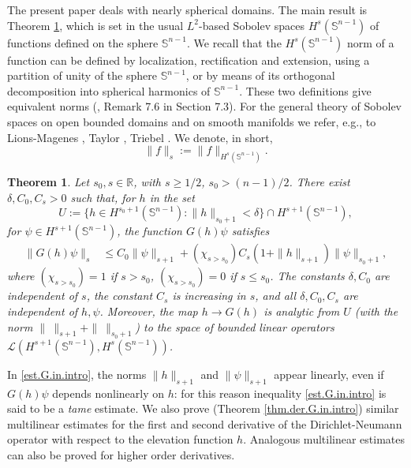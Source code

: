 \documentclass[10pt,reqno,a4paper]{article}
\numberwithin{equation}{section}
\theoremstyle{plain}
\newtheorem{theorem}{Theorem}[section]
\theoremstyle{definition}
\newcommand{\R}{{\mathbb R}}
\renewcommand{\S}{{\mathbb S}}
\newcommand{\mL}{\mathcal{L}}
\begin{document}
The present paper deals with nearly spherical domains. 
The main result is Theorem \ref{thm.G.in.intro}, which is 
set in the usual $L^2$-based Sobolev spaces $H^s(\S^{n-1})$ 
of functions defined on the sphere $\S^{n-1}$. 
We recall that the $H^s(\S^{n-1})$ norm of a function 
can be defined by localization, rectification and extension, 
using a partition of unity of the sphere $\S^{n-1}$,  
or by means of its orthogonal decomposition into spherical harmonics of $\S^{n-1}$. 
These two definitions give equivalent norms 
(\cite{Lions.Magenes.volume.1}, Remark 7.6 in Section 7.3). 
For the general theory of Sobolev spaces on open bounded domains and on smooth manifolds 
we refer, e.g., to Lions-Magenes \cite{Lions.Magenes.volume.1}, 
Taylor \cite{Taylor.volume.1}, Triebel \cite{Triebel.1983}. 
We denote, in short, 
\begin{equation} \label{short.norm}
\| f \|_s := \| f \|_{H^s(\S^{n-1})}.
\end{equation}

\begin{theorem} \label{thm.G.in.intro}
Let $s_0, s \in \R$, with $s \geq 1/2$, $s_0 > (n-1)/2$. 
There exist $\delta, C_0, C_s > 0$ such that, 
for $h$ in the set 
\[
U := \{ h \in H^{s_0+1}(\S^{n-1}) : \| h \|_{s_0+1} < \delta \} 
\cap H^{s+1}(\S^{n-1}),
\] 
for $\psi \in H^{s+1}(\S^{n-1})$, 
the function $G(h)\psi$ satisfies 
\begin{align}
\| G(h)\psi \|_{s}
& \leq C_0 \| \psi \|_{s+1} 
+ (\chi_{s > s_0}) C_s (1 + \| h \|_{s+1}) \| \psi \|_{s_0+1},
\label{est.G.in.intro}
\end{align}
where 
$(\chi_{s>s_0}) = 1$ if $s>s_0$, 
$(\chi_{s>s_0}) = 0$ if $s \leq s_0$. 
The constants $\delta, C_0$ are independent of $s$, 
the constant $C_s$ is increasing in $s$, 
and all $\delta, C_0, C_s$ are independent of $h,\psi$. 
Moreover, the map $h \to G(h)$ is analytic from $U$ 
(with the norm $\| \ \|_{s+1} + \| \ \|_{s_0+1}$) 
to the space of bounded linear operators 
$\mL (H^{s+1}(\S^{n-1}) , H^{s}(\S^{n-1}) )$.
\end{theorem}

In \eqref{est.G.in.intro}, the norms $\| h \|_{s+1}$ and $\| \psi \|_{s+1}$ appear linearly, 
even if $G(h)\psi$ depends nonlinearly on $h$:  
for this reason inequality \eqref{est.G.in.intro} is said to be a \emph{tame} estimate. 
We also prove (Theorem \ref{thm.der.G.in.intro}) similar multilinear estimates 
for the first and second derivative of the Dirichlet-Neumann operator with respect to the elevation function $h$. 
Analogous multilinear estimates can also be proved for higher order derivatives.  
 
\end{document}
